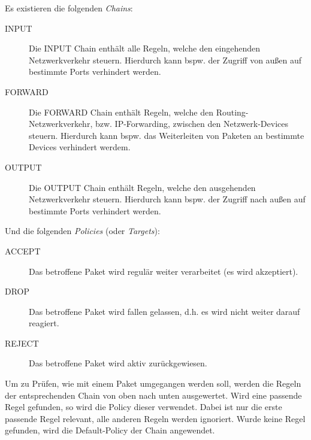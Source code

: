 			    Es existieren die folgenden \textit{Chains}:
			    \begin{description}
			    	\item[INPUT]   Die INPUT Chain enthält alle Regeln, welche den eingehenden Netzwerkverkehr steuern. Hierdurch kann bspw. der Zugriff von außen auf bestimmte Ports verhindert werden.
			    	\item[FORWARD] Die FORWARD Chain enthält Regeln, welche den Routing-Netzwerkverkehr, bzw. IP-Forwarding, zwischen den Netzwerk-Devices steuern. Hierdurch kann bspw. das Weiterleiten von Paketen an bestimmte Devices verhindert werdem.
			    	\item[OUTPUT]  Die OUTPUT Chain enthält Regeln, welche den ausgehenden Netzwerkverkehr steuern. Hierdurch kann bspw. der Zugriff nach außen auf bestimmte Ports verhindert werden.
			    \end{description}
			    
			    Und die folgenden \textit{Policies} (oder \textit{Targets}):
			    \begin{description}
			    	\item[ACCEPT] Das betroffene Paket wird regulär weiter verarbeitet (es wird akzeptiert).
			    	\item[DROP]   Das betroffene Paket wird fallen gelassen, d.h. es wird nicht weiter darauf reagiert.
			    	\item[REJECT] Das betroffene Paket wird aktiv zurückgewiesen.
			    \end{description}
		    
			    Um zu Prüfen, wie mit einem Paket umgegangen werden soll, werden die Regeln der entsprechenden Chain von oben nach unten ausgewertet. Wird eine passende Regel gefunden, so wird die Policy dieser verwendet. Dabei ist nur die erste passende Regel relevant, alle anderen Regeln werden ignoriert. Wurde keine Regel gefunden, wird die Default-Policy der Chain angewendet.
		    
